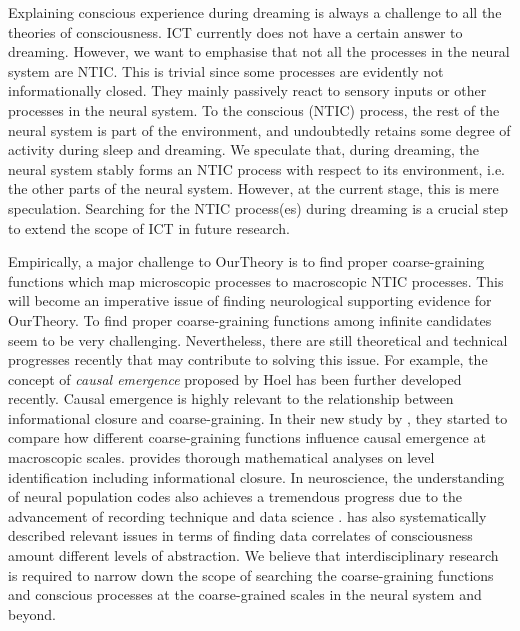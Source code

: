 \documentclass[utf8]{article}
\begin{document}
        Explaining conscious experience during dreaming is always a challenge to all the theories of consciousness. ICT currently does not have a certain answer to dreaming. However, we want to emphasise that not all the processes in the neural system are NTIC. This is trivial since some processes are evidently not informationally closed. They mainly passively react to sensory inputs or other processes in the neural system. To the conscious (NTIC) process, the rest of the neural system is part of the environment, and undoubtedly retains some degree of activity during sleep and dreaming. We speculate that, during dreaming, the neural system stably forms an NTIC process with respect to its environment, i.e. the other parts of the neural system. However, at the current stage, this is mere speculation. Searching for the NTIC process(es) during dreaming is a crucial step to extend the scope of ICT in future research. 
        
        Empirically, a major challenge to \ac{OurTheory} is to find proper coarse-graining functions which map microscopic processes to macroscopic NTIC processes. This will become an imperative issue of finding neurological supporting evidence for \ac{OurTheory}. To find proper coarse-graining functions among infinite candidates \citep{price2007causation} seem to be very challenging. Nevertheless, there are still theoretical and technical progresses recently that may contribute to  solving this issue. For example, the concept of \textit{causal emergence} proposed by Hoel \citep{Hoel19790, Hoel2018} has been further developed recently. Causal emergence is highly relevant to the relationship between informational closure and coarse-graining. In their new study by \cite{klein2019uncertainty}, they started to compare how different coarse-graining functions influence causal emergence at macroscopic scales. \cite{PFANTE.2014, PFANTE.2014b} provides thorough mathematical analyses on level identification including informational closure. In neuroscience, the understanding of neural population codes also achieves a tremendous progress due to the advancement of recording technique and data science \citep{Kohn2016, panzeri2015neural}. \cite{Gamez2016} has also systematically described relevant issues in terms of finding data correlates of consciousness amount different levels of abstraction. We believe that interdisciplinary research is required to narrow down the scope of searching the coarse-graining functions and conscious processes at the coarse-grained scales in the neural system and beyond. 
        
\end{document}
